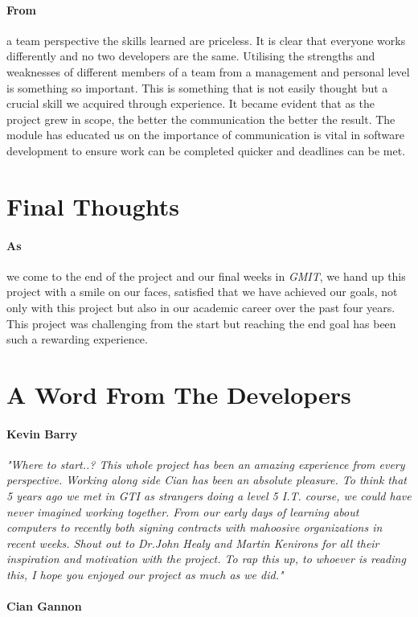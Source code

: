 \paragraph{From} a team perspective the skills learned are priceless. It is clear that everyone works differently and no two developers are the same. Utilising the strengths and weaknesses of different members of a team from a management and personal level is something so important. This is something that is not easily thought but a crucial skill we acquired through experience. It became evident that as the project grew in scope, the better the communication the better the result. The module has educated us on the importance of communication is vital in software development to ensure work can be completed quicker and deadlines can be met.

\section{Final Thoughts} 
\paragraph{As} we come to the end of the project and our final weeks in \textit{GMIT}, we hand up this project with a smile on our faces, satisfied that we have achieved our goals, not only with this project but also in our academic career over the past four years. This project was challenging from the start but reaching the end goal has been such a rewarding experience.

\section{A Word From The Developers}

\paragraph{Kevin Barry}\textit{"Where to start..? This whole project has been an amazing experience from every perspective. Working along side Cian has been an absolute pleasure. To think that 5 years ago we met in GTI as strangers doing a level 5 I.T. course, we could have never imagined working together. From our early days of learning about computers to recently both signing contracts with mahoosive organizations in recent weeks. Shout out to Dr.John Healy and Martin Kenirons for all their inspiration and motivation with the project. To rap this up, to whoever is reading this, I hope you enjoyed our project as much as we did."}

\paragraph{Cian Gannon}

